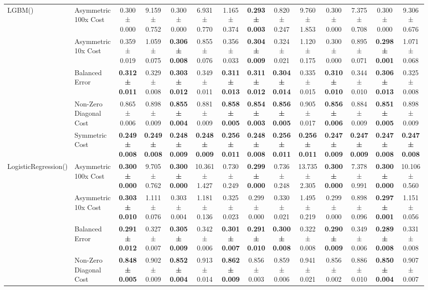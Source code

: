 \begin{table}[H]
{\begin{tabular}{llcccccccccccc}
\cline{1-14}
\multirow[t]{5}{*}{LGBM()} & Asymmetric 100x Cost & 0.300 ± 0.000 & 9.159 ± 0.752 & 0.300 ± 0.000 & 6.931 ± 0.770 & 1.165 ± 0.374 & \textbf{0.293 ± 0.003} & 0.820 ± 0.247 & 9.760 ± 1.853 & 0.300 ± 0.000 & 7.375 ± 0.708 & 0.300 ± 0.000 & 9.306 ± 0.676 \\
 & Asymmetric 10x Cost & 0.359 ± 0.019 & 1.059 ± 0.075 & \textbf{0.306 ± 0.008} & 0.855 ± 0.076 & 0.356 ± 0.033 & \textbf{0.304 ± 0.009} & 0.324 ± 0.021 & 1.120 ± 0.175 & 0.300 ± 0.000 & 0.895 ± 0.071 & \textbf{0.298 ± 0.001} & 1.071 ± 0.068 \\
 & Balanced Error & \textbf{0.312 ± 0.011} & 0.329 ± 0.008 & \textbf{0.303 ± 0.012} & 0.349 ± 0.011 & \textbf{0.311 ± 0.013} & \textbf{0.311 ± 0.012} & \textbf{0.304 ± 0.014} & 0.335 ± 0.015 & \textbf{0.310 ± 0.010} & 0.344 ± 0.010 & \textbf{0.306 ± 0.013} & 0.325 ± 0.008 \\
 & Non-Zero Diagonal Cost & 0.865 ± 0.006 & 0.898 ± 0.009 & \textbf{0.855 ± 0.004} & 0.881 ± 0.009 & \textbf{0.858 ± 0.005} & \textbf{0.854 ± 0.003} & \textbf{0.856 ± 0.005} & 0.905 ± 0.017 & \textbf{0.856 ± 0.006} & 0.884 ± 0.009 & \textbf{0.851 ± 0.005} & 0.898 ± 0.009 \\
 & Symmetric Cost & \textbf{0.249 ± 0.008} & \textbf{0.249 ± 0.008} & \textbf{0.248 ± 0.009} & \textbf{0.248 ± 0.009} & \textbf{0.256 ± 0.011} & \textbf{0.248 ± 0.008} & \textbf{0.256 ± 0.011} & \textbf{0.256 ± 0.011} & \textbf{0.247 ± 0.009} & \textbf{0.247 ± 0.009} & \textbf{0.247 ± 0.008} & \textbf{0.247 ± 0.008} \\
\cline{1-14}
\multirow[t]{5}{*}{LogisticRegression()} & Asymmetric 100x Cost & \textbf{0.300 ± 0.000} & 9.705 ± 0.762 & \textbf{0.300 ± 0.000} & 10.361 ± 1.427 & 0.730 ± 0.249 & \textbf{0.299 ± 0.000} & 0.736 ± 0.248 & 13.735 ± 2.305 & \textbf{0.300 ± 0.000} & 7.378 ± 0.991 & \textbf{0.300 ± 0.000} & 10.106 ± 0.560 \\
 & Asymmetric 10x Cost & \textbf{0.303 ± 0.010} & 1.111 ± 0.076 & 0.303 ± 0.004 & 1.181 ± 0.136 & 0.325 ± 0.023 & 0.299 ± 0.000 & 0.330 ± 0.021 & 1.495 ± 0.219 & 0.299 ± 0.000 & 0.898 ± 0.096 & \textbf{0.297 ± 0.001} & 1.151 ± 0.056 \\
 & Balanced Error & \textbf{0.291 ± 0.012} & 0.327 ± 0.007 & \textbf{0.305 ± 0.009} & 0.342 ± 0.006 & \textbf{0.301 ± 0.007} & \textbf{0.291 ± 0.010} & \textbf{0.300 ± 0.008} & 0.322 ± 0.008 & \textbf{0.290 ± 0.009} & 0.349 ± 0.006 & \textbf{0.289 ± 0.008} & 0.331 ± 0.008 \\
 & Non-Zero Diagonal Cost & \textbf{0.848 ± 0.005} & 0.902 ± 0.009 & \textbf{0.852 ± 0.004} & 0.913 ± 0.014 & \textbf{0.862 ± 0.009} & 0.856 ± 0.003 & 0.859 ± 0.006 & 0.941 ± 0.021 & 0.856 ± 0.002 & 0.886 ± 0.010 & \textbf{0.850 ± 0.004} & 0.907 ± 0.007 \\

\end{tabular}}
\end{table}
